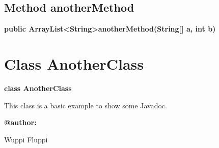 \documentclass[12pt]{scrreprt}
\begin{document}
\section{Method anotherMethod}
\label{examples.SimpleExample:anotherMethod}




\textbf{public ArrayList\textless String\textgreater  anotherMethod(String[] a, int b)}








\chapter{Class AnotherClass}
\label{examples.AnotherClass}




\textbf{class AnotherClass}


This class is a basic example to show some Javadoc.


\textbf{@author:}

\quad\quad Wuppi Fluppi
\end{document}
